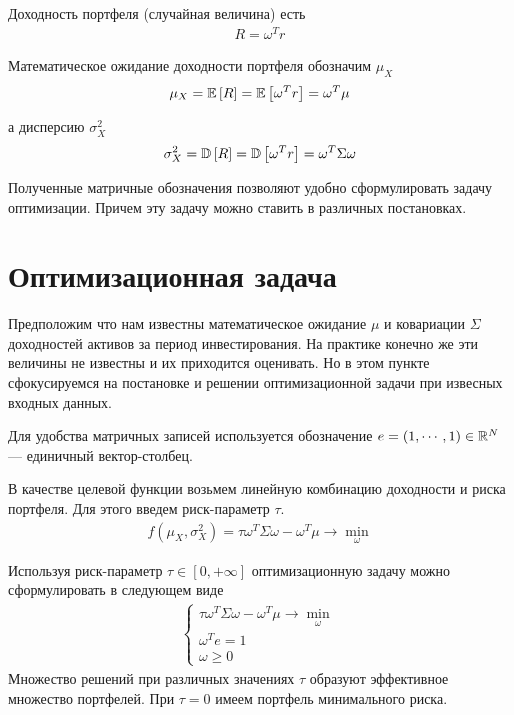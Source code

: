 Доходность портфеля (случайная величина) есть
\begin{align}
	R = \omega^T r
\end{align}

Математическое ожидание доходности портфеля обозначим $\mu_X$
\begin{align}
	\mu_X = \mathbb{E}\left[R\right] = \mathbb{E}\left[\omega^T r\right] = \omega^T \mu
\end{align}

а дисперсию $\sigma_X^2$
\begin{align}
	\sigma_X^2 = \mathbb{D}\left[R\right] = \mathbb{D}\left[\omega^T r\right] = \omega^T \Sigma \omega
\end{align}

Полученные матричные обозначения позволяют удобно сформулировать задачу оптимизации.
Причем эту задачу можно ставить в различных постановках.

\section{Оптимизационная задача}

Предположим что нам известны математическое ожидание $\mu$ и ковариации $\Sigma$ доходностей активов за период инвестирования.
На практике конечно же эти величины не известны и их приходится оценивать. Но в этом пункте сфокусируемся
на постановке и решении оптимизационной задачи при извесных входных данных.

Для удобства матричных записей используется обозначение $e = (1, \cdots, 1) \in \mathbb{R}^N$ --- единичный вектор-столбец.


В качестве целевой функции возьмем линейную комбинацию доходности и риска портфеля. Для этого введем риск-параметр $\tau$.
\begin{align}
	f\left(\mu_X, \sigma_X^2 \right) = \tau \omega^T \Sigma \omega - \omega^T \mu \rightarrow \min_{\omega}
\end{align}

Используя риск-параметр $\tau \in [0, +\infty]$ оптимизационную задачу можно сформулировать в следующем виде
\begin{align}
	\begin{cases}
		\tau \omega^T \Sigma \omega - \omega^T \mu \rightarrow \min_{\omega} \\
		\omega^T e = 1 \\
		\omega \ge 0
	\end{cases}
\end{align}
Множество решений при различных значениях $\tau$ образуют эффективное множество портфелей.
При $\tau = 0$ имеем портфель минимального риска.

